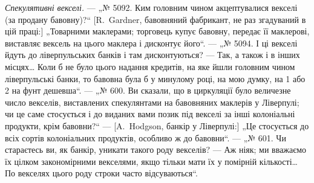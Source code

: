 \emph{Спекулятивні векселі.} — „№ 5092. Ким головним чином акцептувалися векселі (за продану бавовну)?“ [R.~Gardner, бавовняний фабрикант, не раз згадуваний в цій праці:] „Товарними маклерами; торговець купує
бавовну,
передає її маклерові, виставляє вексель на цього маклера і дисконтує його“. — „№ 5094. І ці векселі
йдуть до ліверпульських банків і там дисконтуються? — Так, а також і в інших місцях\dots{} Коли б не
було цього надання кредитів, на яке
йшли головним чином ліверпульські банки, то бавовна була б у минулому році,
на мою думку, на 1 або 2 на фунт дешевша“. — „№ 600. Ви сказали,
що в циркуляції було величезне число векселів, виставлених спекулянтами на
бавовняних маклерів у Ліверпулі; чи це саме стосується і до виданих вами
позик під векселі за інші колоніальні продукти, крім бавовни?“ — [A.~Hodgson,
банкір у Ліверпулі:] „Це стосується до всіх сортів колоніальних продуктів,
особливо ж до бавовни“. — „№ 601. Чи стараєтесь ви, як банкір, уникати
такого роду векселів? — Аж ніяк; ми вважаємо їх цілком закономірними векселями, якщо тільки мати їх
у помірній кількості\dots{} По векселях цього роду
строки часто відсуваються“.

